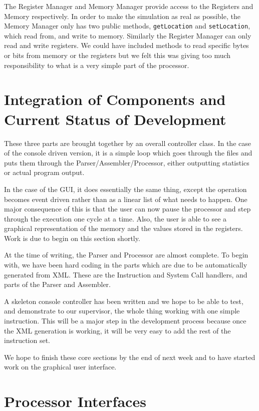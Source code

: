 \documentclass[12pt]{report}
\begin{document}
The Register Manager and Memory Manager provide access to the Registers and Memory respectively.  In order to make the simulation as real as possible, the Memory Manager only has two public methods, {\tt getLocation} and {\tt setLocation}, which read from, and write to memory.  Similarly the Register Manager can only read and write registers.  We could have included methods to read specific bytes or bits from memory or the registers but we felt this was giving too much responsibility to what is a very simple part of the processor.


\chapter{Integration of Components and Current Status of Development}

These three parts are brought together by an overall controller class.  In the case of the console driven version, it is a simple loop which goes through the files and puts them through the Parser/Assembler/Processor, either outputting statistics or actual program output.

In the case of the GUI, it does essentially the same thing, except the operation becomes event driven rather than as a linear list of what needs to happen.  One major consequence of this is that the user can now pause the processor and step through the execution one cycle at a time.  Also, the user is able to see a graphical representation of the memory and the values stored in the registers.  Work is due to begin on this section shortly.

At the time of writing, the Parser and Processor are almost complete.  To begin with, we have been hard coding in the parts which are due to be automatically generated from XML.  These are the Instruction and System Call handlers, and parts of the Parser and Assembler.

A skeleton console controller has been written and we hope to be able to test, and demonstrate to our supervisor, the whole thing working with one simple instruction.  This will be a major step in the development process because once the XML generation is working, it will be very easy to add the rest of the instruction set.

We hope to finish these core sections by the end of next week and to have started work on the graphical user interface.


\appendix
\chapter{Processor Interfaces}
\label{appProcessorInterfaces}
\end{document}
